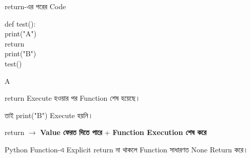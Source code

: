 \begin{codeoutputbox}{\textenglish{\ttfamily return}-এর পরের Code}

\noindent
\begin{minipage}[t]{0.52\linewidth}
\codeheading

\begin{english}
\ttfamily
def test():\\
\hspace*{4mm}print("A")\\
\hspace*{4mm}return\\
\hspace*{4mm}print("B")\\[0.5mm]
test()
\end{english}

\end{minipage}
\hfill
\begin{minipage}[t]{0.44\linewidth}
\outputheading

\begin{center}
\textenglish{\ttfamily A}
\end{center}

\textenglish{\ttfamily return}
Execute হওয়ার পর Function শেষ হয়েছে।

তাই
\textenglish{\ttfamily print("B")}
Execute হয়নি।

\end{minipage}

\end{codeoutputbox}

\begin{rememberbox}

\begin{center}

\textenglish{\ttfamily return}
\(\longrightarrow\)
\textbf{Value ফেরত দিতে পারে}
+
\textbf{Function Execution শেষ করে}

\end{center}

\end{rememberbox}



Python Function-এ Explicit
\textenglish{\ttfamily return}
না থাকলে Function সাধারণত
\textenglish{\ttfamily None}
Return করে।

